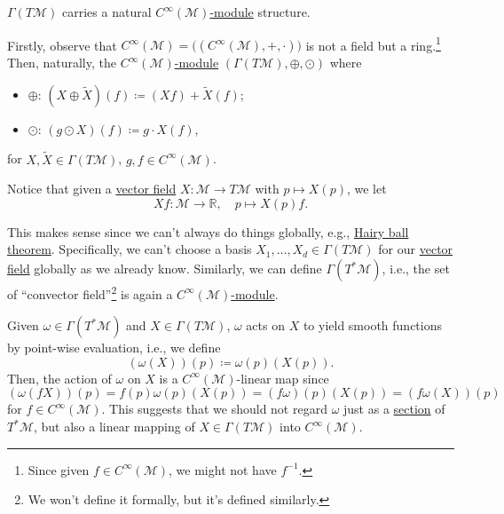 \begin{claim}
	\(\Gamma (T \mathcal{M} )\) carries a natural \hyperref[def:module]{\(C^{\infty} (\mathcal{M} )\)-module} structure.
\end{claim}
\begin{explanation}
	Firstly, observe that \(C^{\infty} (\mathcal{M} ) = \big( (C^{\infty} (\mathcal{M} ), +, \cdot)\big)\) is not a field but a ring.\footnote{Since given \(f\in C^{\infty} (\mathcal{M} )\), we might not have \(f^{-1} \).} Then, naturally, the \hyperref[def:module]{\(C^{\infty} (\mathcal{M} )\)-module} \((\Gamma (T\mathcal{M} ), \oplus , \odot)\) where
	\begin{itemize}
		\item \(\oplus \): \((X \oplus \widetilde{X} )(f) \coloneqq (Xf) + \widetilde{X} (f)\);
		\item \(\odot\): \((g\odot X)(f) \coloneqq g\cdot X(f)\),
	\end{itemize}
	for \(X, \widetilde{X} \in \Gamma (T \mathcal{M} )\), \(g, f\in C^{\infty} (\mathcal{M} )\).
\end{explanation}

\begin{notation}
	Notice that given a \hyperref[def:vector-field]{vector field} \(X\colon \mathcal{M} \to  T \mathcal{M} \) with \(p \mapsto X(p)\), we let
	\[
		Xf\colon \mathcal{M} \to \mathbb{R} ,\quad p \mapsto X(p) f.
	\]
\end{notation}

This makes sense since we can't always do things globally, e.g., \href{https://en.wikipedia.org/wiki/Hairy_ball_theorem}{Hairy ball theorem}. Specifically, we can't choose a basis \(X_1, \ldots , X_d\in \Gamma (T \mathcal{M} )\) for our \hyperref[def:vector-field]{vector field} globally as we already know. Similarly, we can define \(\Gamma (T^{\ast} \mathcal{M} )\), i.e., the set of ``convector field''\footnote{We won't define it formally, but it's defined similarly.} is again a \hyperref[def:module]{\(C^{\infty} (\mathcal{M} )\)-module}.

\begin{eg}
	Given \(\omega \in \Gamma (T^{\ast} \mathcal{M} )\) and \(X\in \Gamma (T \mathcal{M} )\), \(\omega \) acts on \(X\) to yield smooth functions by point-wise evaluation, i.e., we define
	\[
		\left( \omega (X) \right) (p) \coloneqq \omega (p) (X(p)).
	\]
	Then, the action of \(\omega \) on \(X\) is a \(C^{\infty} (\mathcal{M} )\)-linear map since
	\[
		(\omega (fX))(p)
		= f(p) \omega (p) (X(p))
		= (f \omega )(p) (X(p))
		= (f \omega (X))(p)
	\]
	for \(f\in C^\infty (\mathcal{M} )\). This suggests that we should not regard \(\omega \) just as a \hyperref[def:section]{section} of \(T^{\ast} \mathcal{M} \), but also a linear mapping of \(X\in \Gamma (T \mathcal{M} )\) into \(C^{\infty} (\mathcal{M} )\).
\end{eg}

